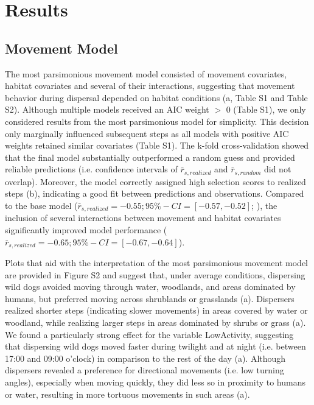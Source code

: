 \documentclass[abstract=on,10pt,a4paper,bibliography=totocnumbered]{article}
\begin{document}
\section{Results}
\subsection{Movement Model}
The most parsimonious movement model consisted of movement covariates, habitat
covariates and several of their interactions, suggesting that movement behavior
during dispersal depended on habitat conditions (a, Table S1
and Table S2). Although multiple models received an AIC weight \(>\) 0 (Table
S1), we only considered results from the most parsimonious model for simplicity.
This decision only marginally influenced subsequent steps as all models with
positive AIC weights retained similar covariates (Table S1). The k-fold
cross-validation showed that the final model substantially outperformed a random
guess and provided reliable predictions (i.e. confidence intervals of
\(\bar{r}_{s, realized}\) and \(\bar{r}_{s, random}\) did not overlap).
Moreover, the model correctly assigned high selection scores to realized steps
(b), indicating a good fit between predictions and
observations. Compared to the base model (\(\bar{r}_{s, realized} = -0.55;
95\%-CI = [-0.57, -0.52]\); \citealp{Hofmann.2021}), the inclusion of several
interactions between movement and habitat covariates significantly improved
model performance (\(\bar{r}_{s, realized} = -0.65; 95\%-CI = [-0.67, -0.64]\)).

Plots that aid with the interpretation of the most parsimonious movement model
are provided in Figure S2 and suggest that, under average conditions, dispersing
wild dogs avoided moving through water, woodlands, and areas dominated by
humans, but preferred moving across shrublands or grasslands
(a). Dispersers realized shorter steps (indicating slower
movements) in areas covered by water or woodland, while realizing larger steps
in areas dominated by shrubs or grass (a). We found a
particularly strong effect for the variable \textsf{LowActivity}, suggesting
that dispersing wild dogs moved faster during twilight and at night (i.e.
between 17:00 and 09:00 o'clock) in comparison to the rest of the day
(a). Although dispersers revealed a preference for
directional movements (i.e. low turning angles), especially when moving quickly,
they did less so in proximity to humans or water, resulting in more tortuous
movements in such areas (a).
\end{document}

